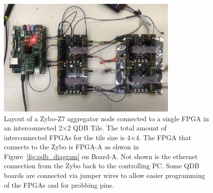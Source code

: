 \begin{figure}[]
\centering
\includegraphics[width=0.8\textwidth]{./images/qdb_frequency_test_setup.jpg}
\caption{Layout of a Zybo-Z7 aggregator node connected to a single FPGA in an interconnected 2$\times$2 QDB Tile.
The total amount of interconnected FPGAs for the tile size is 4$\times$4.
The FPGA that connects to the Zybo is FPGA-A as shwon in Figure~\ref{fig:qdb_diagram} on Board-A.
Not shown is the ethernet connection from the Zybo back to the controlling PC.
Some QDB boards are connected via jumper wires to allow easier programming of the FPGAs and for probbing pins.
}
\end{figure}~\label{fig:qdb_test_setup}

